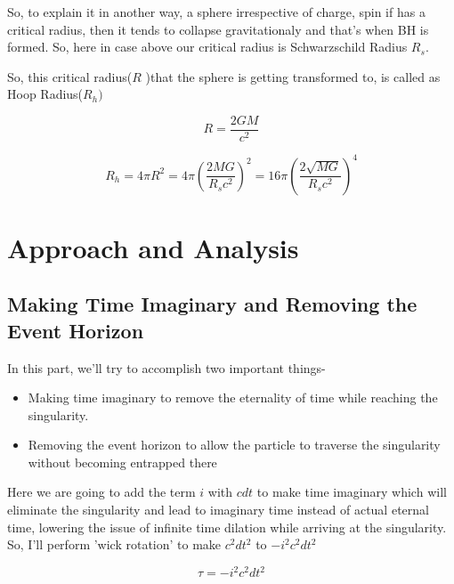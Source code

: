 \documentclass{article}
\begin{document}
So, to explain it in another way, a sphere irrespective of charge, spin if has a critical radius, then it tends to collapse gravitationaly and that's when BH is formed. So, here in case above our critical radius is 
Schwarzschild Radius $R_s$.


So, this critical radius($R$ )that the sphere is getting transformed to, is called as  Hoop Radius($R_h)$

\begin{equation}
    R = \frac{2GM}{c^2}
    \label{1}
\end{equation}


\begin{equation}
    R_h=4\pi R^2=4\pi \left(\frac{2MG}{R_s c^2}\right)^2=16\pi\left(\frac{2\sqrt{MG}}{R_s c^2}\right)^4
    \label{20}
\end{equation}








\section{\Large Approach and Analysis}
\subsection{\Large Making Time Imaginary and Removing the Event Horizon}

In this part, we'll try to accomplish two important things-

\begin{itemize}
    \item Making time imaginary to remove the eternality of time while reaching the singularity.
    \item Removing the event horizon to allow the particle to traverse the singularity without becoming entrapped there 

\end{itemize}

Here we are going to add the term \textbf{$i$} with $cdt$ to make time imaginary  which will eliminate the singularity and lead to imaginary time instead of actual eternal time, lowering the issue of infinite time dilation while arriving at the singularity. So, I'll perform 'wick rotation' to make  $c^2dt^2$ to $-i^2c^2dt^2$

\begin{equation}
   \tau =-i^2c^2dt^2 
\label{2}
\end{equation}
\end{document}
